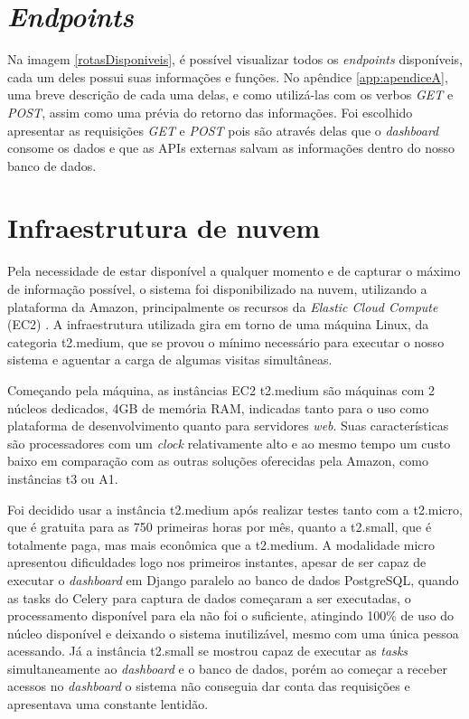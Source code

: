 \section{\textit{Endpoints}}
\indent
\par Na imagem \ref{rotasDisponiveis}, é possível visualizar todos os \textit{endpoints} disponíveis, cada um deles possui suas informações e funções. No apêndice \ref{app:apendiceA}, uma breve descrição de cada uma delas, e como utilizá-las com os verbos \textit{GET} e \textit{POST}, assim como uma prévia do retorno das informações. Foi escolhido apresentar as requisições \textit{GET} e \textit{POST} pois são através delas que o \textit{dashboard} consome os dados e que as APIs externas salvam as informações dentro do nosso banco de dados.

\section{Infraestrutura de nuvem}
\indent
\par Pela necessidade de estar disponível a qualquer momento e de capturar o máximo de informação possível, o sistema foi disponibilizado na nuvem, utilizando a plataforma da Amazon, principalmente os recursos da \textit{Elastic Cloud Compute} (EC2) \cite{EC2}. A infraestrutura utilizada gira em torno de uma máquina Linux, da categoria t2.medium, que se provou o mínimo necessário para executar o nosso sistema e aguentar a carga de algumas visitas simultâneas.
\indent
\par Começando pela máquina, as instâncias EC2 t2.medium são máquinas com 2 núcleos dedicados, 4GB de memória RAM, indicadas tanto para o uso como plataforma de desenvolvimento quanto para servidores \textit{web}. Suas características são processadores com um \textit{clock} relativamente alto e ao mesmo tempo um custo baixo em comparação com as outras soluções oferecidas pela Amazon, como instâncias t3 ou A1. 
\indent
\par Foi decidido usar a instância t2.medium após realizar testes tanto com a t2.micro, que é gratuita para as 750 primeiras horas por mês, quanto a t2.small, que é totalmente paga, mas mais econômica que a t2.medium. A modalidade micro apresentou dificuldades logo nos primeiros instantes, apesar de ser capaz de executar o \textit{dashboard} em Django paralelo ao banco de dados PostgreSQL, quando as tasks do Celery para captura de dados começaram a ser executadas, o processamento disponível para ela não foi o suficiente, atingindo 100\% de uso do núcleo disponível e deixando o sistema inutilizável, mesmo com uma única pessoa acessando. Já a instância t2.small se mostrou capaz de executar as \textit{tasks} simultaneamente ao \textit{dashboard} e o banco de dados, porém ao começar a receber acessos no \textit{dashboard} o sistema não conseguia dar conta das requisições e apresentava uma constante lentidão. 
